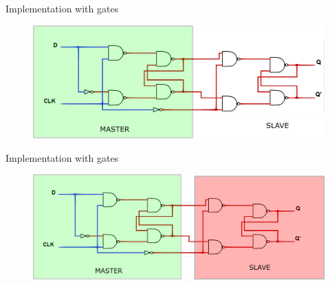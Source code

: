 \documentclass{beamer}
\begin{document}
\begin{frame}{Implementation with gates}
   
    
    \begin{figure}[H]
        \centering
        
        \includegraphics[scale=.15]{images/masterNandsvgBlocked.png}
        
        
        \label{fig:my_label}
    \end{figure}
    
\end{frame}

\begin{frame}{Implementation with gates}
   
    
    \begin{figure}[H]
        \centering
        
        \includegraphics[scale=.15]{images/masterSlaveNandBlocked.png}
        
        
        \label{fig:my_label}
    \end{figure}
    
\end{frame}
\end{document}
